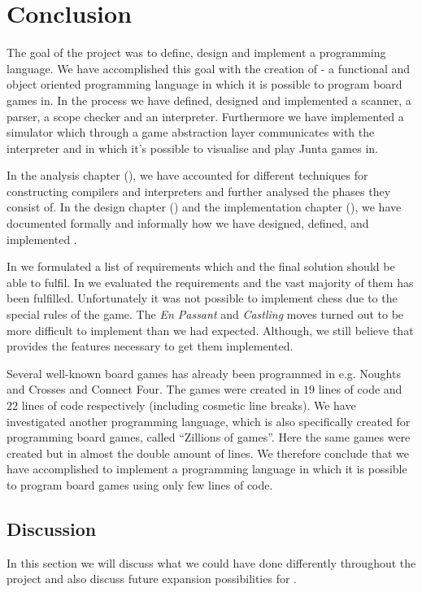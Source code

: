 \chapter{Conclusion}
\label{chap:conclusion}

The goal of the project was to define, design and implement a programming language. 
We have accomplished this goal with the creation of \productname{} - a functional and object oriented programming
language in which it is possible to program board games in. In the process we have defined, 
designed and implemented a scanner, a parser, a scope checker and an interpreter. 
Furthermore we have implemented a simulator which through a game abstraction layer 
communicates with the interpreter and in which it's possible to visualise and play Junta games in.

In the analysis chapter (), we
have accounted for different techniques for constructing compilers and interpreters 
and further analysed the phases they consist of. In the design
chapter () and the implementation chapter
(), we have documented formally and
informally how we have designed, defined, and implemented \productname{}.

In  we formulated a list of requirements which \productname{} and the final solution should be
able to fulfil. In  we evaluated the requirements and the vast majority of them has been fulfilled. Unfortunately it was not possible to implement chess due to the special rules of the game.
The \textit{En Passant} and \textit{Castling} moves turned out to be more
difficult to implement than we had expected. Although, we still believe that \productname{} provides the features 
necessary to get them implemented.

Several well-known board games has already been programmed in \productname{} e.g. Noughts and
Crosses and Connect Four. The games were created in $19$ lines of code and $22$ lines of code respectively (including cosmetic line breaks). 
We have investigated another programming language, which is also specifically created for programming board games, called ``Zillions of games''. Here the
same games were created but in almost the double amount of lines. We therefore conclude that we have accomplished to
implement a programming language in which it is possible to program board games using only few lines of code.

\section{Discussion}
\label{sec:discussion}

In this section we will discuss what we could have done differently throughout
the project and also discuss future expansion possibilities for \productname{}.

%






